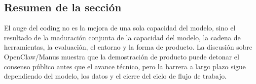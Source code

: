 \subsection{Resumen de la sección}

El auge del coding no es la mejora de una sola capacidad del modelo, sino el resultado de la maduración conjunta de la capacidad del modelo, la cadena de herramientas, la evaluación, el entorno y la forma de producto. La discusión sobre OpenClaw/Manus muestra que la demostración de producto puede detonar el consenso público antes que el avance técnico, pero la barrera a largo plazo sigue dependiendo del modelo, los datos y el cierre del ciclo de flujo de trabajo.
